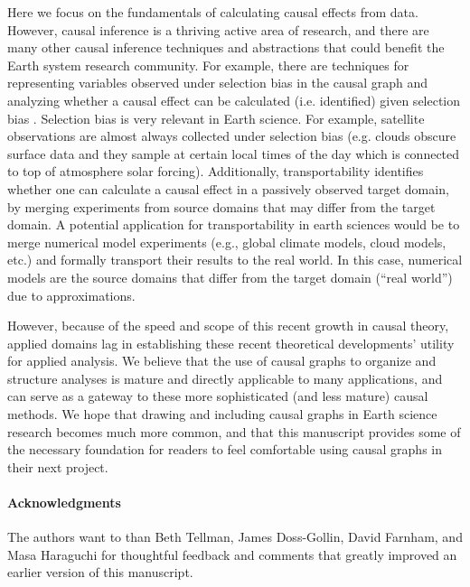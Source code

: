 \documentclass[12pt]{article}
\begin{document}
Here we focus on the fundamentals of calculating causal effects from
data. However, causal inference is a thriving active area of research,
and there are many other causal inference techniques and abstractions
that could benefit the Earth system research community. For example,
there are techniques for representing variables observed under
selection bias in the causal graph and analyzing whether a causal
effect can be calculated (i.e. identified) given selection bias
\citep[e.g.,][]{bareinboim2014recovering}. Selection bias is very
relevant in Earth science. For example, satellite observations are
almost always collected under selection bias (e.g. clouds obscure
surface data and they sample at certain local times of the day which
is connected to top of atmosphere solar forcing). Additionally,
transportability \citep[e.g.,][]{bareinboim2012transportability}
identifies whether one can calculate a causal effect in a passively
observed target domain, by merging experiments from source domains
that may differ from the target domain. A potential application for
transportability in earth sciences would be to merge numerical model
experiments (e.g., global climate models, cloud models, etc.) and
formally transport their results to the real world. In this case,
numerical models are the source domains that differ from the target
domain (``real world'') due to approximations.

However, because of the speed and scope of this recent growth in
causal theory, applied domains lag in establishing these recent
theoretical developments' utility for applied analysis. We believe
that the use of causal graphs to organize and structure analyses is
mature and directly applicable to many applications, and can serve as
a gateway to these more sophisticated (and less mature) causal
methods. We hope that drawing and including causal graphs in Earth
science research becomes much more common, and that this manuscript
provides some of the necessary foundation for readers to feel
comfortable using causal graphs in their next project.

\paragraph{Acknowledgments} The authors want to than Beth Tellman,
James Doss-Gollin, David Farnham, and Masa Haraguchi for thoughtful
feedback and comments that greatly improved an earlier version of this
manuscript.



\end{document}
